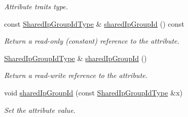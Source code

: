 \begin{DoxyCompactItemize}
\begin{DoxyCompactList}\small\item\em Attribute traits type. \item\end{DoxyCompactList}\item 
const \hyperlink{classopenstack_1_1xml_1_1ShareIp_a87dc25c5a0ba0a3cc1de61d027d9443d}{SharedIpGroupIdType} \& \hyperlink{classopenstack_1_1xml_1_1ShareIp_a07e7ed98732a798ef87cfcd1758d249e}{sharedIpGroupId} () const 
\begin{DoxyCompactList}\small\item\em Return a read-\/only (constant) reference to the attribute. \item\end{DoxyCompactList}\item 
\hyperlink{classopenstack_1_1xml_1_1ShareIp_a87dc25c5a0ba0a3cc1de61d027d9443d}{SharedIpGroupIdType} \& \hyperlink{classopenstack_1_1xml_1_1ShareIp_a9e6ad832ebd1745d4c3cf86da029c5d8}{sharedIpGroupId} ()
\begin{DoxyCompactList}\small\item\em Return a read-\/write reference to the attribute. \item\end{DoxyCompactList}\item 
void \hyperlink{classopenstack_1_1xml_1_1ShareIp_a6f0bbd99595891a19fcf1d2e1743cc30}{sharedIpGroupId} (const \hyperlink{classopenstack_1_1xml_1_1ShareIp_a87dc25c5a0ba0a3cc1de61d027d9443d}{SharedIpGroupIdType} \&x)
\begin{DoxyCompactList}\small\item\em Set the attribute value. \item\end{DoxyCompactList}\end{DoxyCompactItemize}
